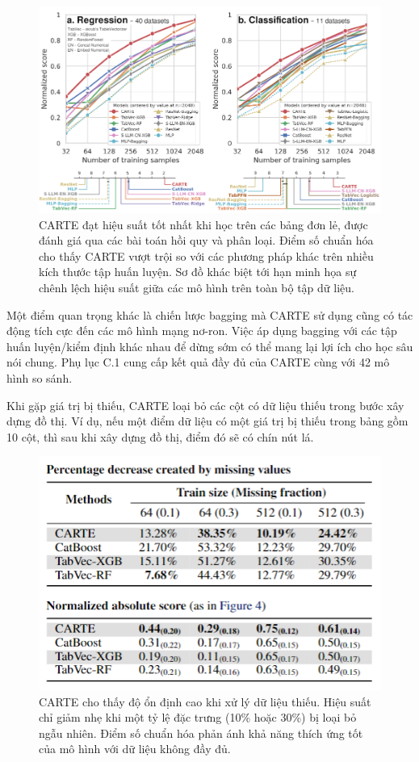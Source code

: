 \documentclass{article}
\begin{document}
\begin{figure} 
    \centering
    \includegraphics[scale = 0.7]{carte_performance_comparison.png}
    \caption{CARTE đạt hiệu suất tốt nhất khi học trên các bảng đơn lẻ, được đánh giá qua các bài toán hồi quy và phân loại. Điểm số chuẩn hóa cho thấy CARTE vượt trội so với các phương pháp khác trên nhiều kích thước tập huấn luyện. Sơ đồ khác biệt tới hạn minh họa sự chênh lệch hiệu suất giữa các mô hình trên toàn bộ tập dữ liệu.}
    \label{fig:carte_performance_comparison}
\end{figure}

Một điểm quan trọng khác là chiến lược bagging mà CARTE sử dụng cũng có tác động tích cực đến các mô hình mạng nơ-ron. Việc áp dụng bagging với các tập huấn luyện/kiểm định khác nhau để dừng sớm có thể mang lại lợi ích cho học sâu nói chung. Phụ lục C.1 cung cấp kết quả đầy đủ của CARTE cùng với 42 mô hình so sánh.

Khi gặp giá trị bị thiếu, CARTE loại bỏ các cột có dữ liệu thiếu trong bước xây dựng đồ thị. Ví dụ, nếu một điểm dữ liệu có một giá trị bị thiếu trong bảng gồm 10 cột, thì sau khi xây dựng đồ thị, điểm đó sẽ có chín nút lá.

\begin{figure} 
    \centering
    \includegraphics[scale = 0.8]{carte_robust_to_missing_value.png}
    \caption{CARTE cho thấy độ ổn định cao khi xử lý dữ liệu thiếu. Hiệu suất chỉ giảm nhẹ khi một tỷ lệ đặc trưng (10\% hoặc 30\%) bị loại bỏ ngẫu nhiên. Điểm số chuẩn hóa phản ánh khả năng thích ứng tốt của mô hình với dữ liệu không đầy đủ.}
    \label{fig:carte_robust_to_missing_value}
\end{figure}
\end{document}

